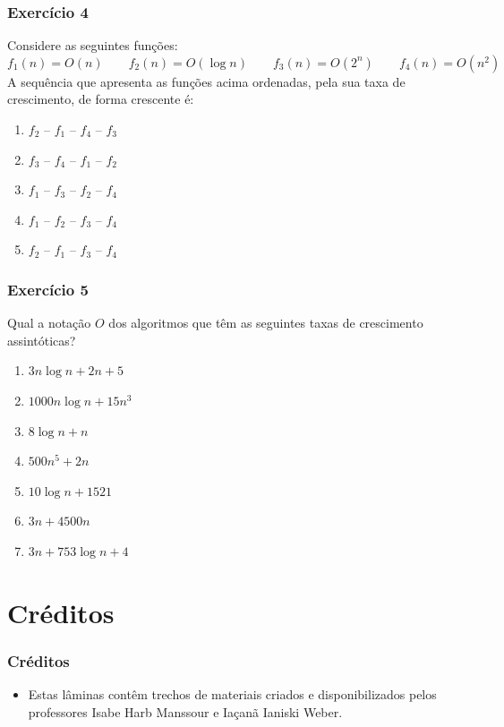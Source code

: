 \documentclass[aspectratio=169]{beamer}
\begin{document}
\begin{frame}[fragile]\frametitle{Exercício 4} %
Considere as seguintes funções:
\[ f_1(n) = O(n) \qquad f_2(n) = O(\log{n}) \qquad f_3(n) = O(2^n) \qquad f_4(n) = O(n^2) \]
A sequência que apresenta as funções acima ordenadas, pela sua taxa de crescimento, de forma crescente é:
\begin{enumerate}[A]
	\item $f_2$ -- $f_1$ -- $f_4$ -- $f_3$ %
	\item $f_3$ -- $f_4$ -- $f_1$ -- $f_2$
	\item $f_1$ -- $f_3$ -- $f_2$ -- $f_4$
	\item $f_1$ -- $f_2$ -- $f_3$ -- $f_4$
	\item $f_2$ -- $f_1$ -- $f_3$ -- $f_4$
\end{enumerate}
\end{frame}

\begin{frame}[fragile]\frametitle{Exercício 5} %
Qual a notação $O$ dos algoritmos que têm as seguintes taxas de crescimento assintóticas?
\begin{enumerate}[a]
	\item $3n\log{n} + 2n + 5$      %
	\item $1000n\log{n} + 15n^3$    %
	\item $8 \log{n} + n$           %
	\item $500n^5 + 2n$             %
	\item $10\log{n} + 1521$        %
	\item $3n + 4500n$              %
	\item $3n + 753\log{n} + 4$     %
\end{enumerate}
	\end{frame}

\section{Créditos}

\begin{frame}\frametitle{Créditos}
\begin{itemize}
	\item Estas lâminas contêm trechos de materiais criados e disponibilizados pelos professores Isabe Harb Manssour e Iaçanã Ianiski Weber.
\end{itemize}
\end{frame}

\end{document}
